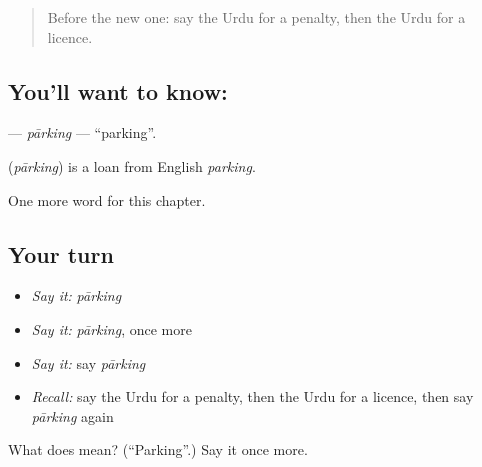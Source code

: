 \label{lesson:UR-C255-parking}



\begin{quote}
Before the new one: say the Urdu for a penalty, then the Urdu for a licence.
\end{quote}

\subsection*{You'll want to know: }
\textbf{} — \emph{pārking} — \textquotedblleft{}parking\textquotedblright{}.

\begin{cousinweb}
\textbf{} (\emph{pārking}) is a loan from English \emph{parking}.
\end{cousinweb}

\begin{grammarlens}[title={What you've built}]
One more word for this chapter.
\end{grammarlens}

\subsection*{Your turn}
\begin{itemize}
\raggedright
  \item \emph{Say it:} \emph{pārking}
  \item \emph{Say it:} \emph{pārking}, once more
  \item \emph{Say it:} say \emph{pārking}
  \item \emph{Recall:} say the Urdu for a penalty, then the Urdu for a licence, then say \emph{pārking} again
\end{itemize}

\begin{tcolorbox}[breakable,colback=teal!4,colframe=teal!35!black,title={Before you move on}]
What does  mean? (\textquotedblleft{}Parking\textquotedblright{}.) Say it once more.
\end{tcolorbox}
